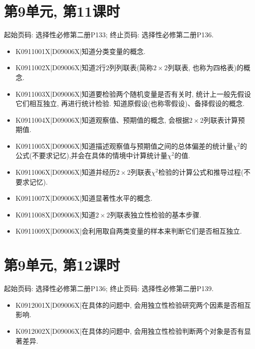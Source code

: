 \section*{第9单元, 第11课时}
起始页码: 选择性必修第二册P133; 终止页码: 选择性必修第二册P136.
\begin{itemize}
\item K0911001X|D09006X|知道分类变量的概念.
\item K0911002X|D09006X|知道$2$行$2$列列联表(简称$2\times 2$列联表, 也称为四格表)的概念.
\item K0911003X|D09006X|知道要检验两个随机变量是否有关时, 统计上一般先假设它们相互独立, 再进行统计检验. 知道原假设(也称零假设)、备择假设的概念.
\item K0911004X|D09006X|知道观察值、预期值的概念, 会根据$2\times 2$列联表计算预期值.
\item K0911005X|D09006X|知道描述观察值与预期值之间的总体偏差的统计量$\chi^2$的公式(不要求记忆),并会在具体的情境中计算统计量$\chi^2$的值.
\item K0911006X|D09006X|知道并经历$2\times 2$列联表$\chi^2$检验的计算公式和推导过程(不要求记忆).
\item K0911007X|D09006X|知道显著性水平的概念.
\item K0911008X|D09006X|知道$2\times 2$列联表独立性检验的基本步骤.
\item K0911009X|D09006X|会利用取自两类变量的样本来判断它们是否相互独立.
\end{itemize}

\section*{第9单元, 第12课时}
起始页码: 选择性必修第二册P136; 终止页码: 选择性必修第二册P139.
\begin{itemize}
\item K0912001X|D09006X|在具体的问题中, 会用独立性检验研究两个因素是否相互影响.
\item K0912002X|D09006X|在具体的问题中, 会用独立性检验判断两个对象是否有显著差异.
\end{itemize}

